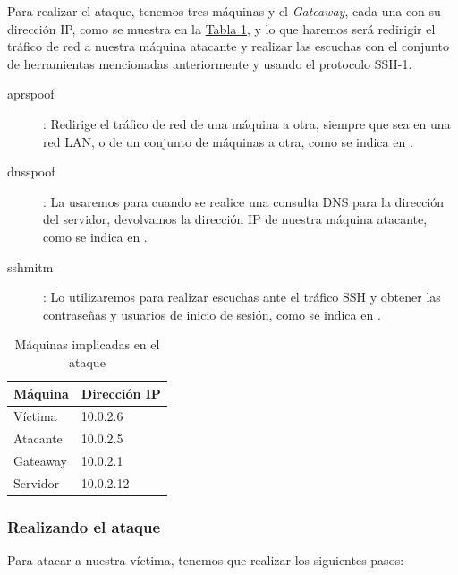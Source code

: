 \documentclass[10pt,a4paper,spanish]{article}
\begin{document}
Para realizar el ataque, tenemos tres máquinas y el \textit{Gateaway}, cada una con su dirección IP, como se muestra en la \hyperref[maquinas]{Tabla \ref*{maquinas}}, y lo que haremos será redirigir el tráfico de red a nuestra máquina atacante y realizar las escuchas con el conjunto de herramientas mencionadas anteriormente y usando el protocolo SSH-1.

\begin{description}
    \item [aprspoof]: Redirige el tráfico de red de una máquina a otra, siempre que sea en una red LAN, o de un conjunto de máquinas a otra, como se indica en \cite{arpspoof}.
    \item [dnsspoof]: La usaremos para cuando se realice una consulta DNS para la dirección del servidor, devolvamos la dirección IP de nuestra máquina atacante, como se indica en \cite{dnsspoof}.
    \item [sshmitm]: Lo utilizaremos para realizar escuchas ante el tráfico SSH y obtener las contraseñas y usuarios de inicio de sesión, como se indica en \cite{sshmitm}.
\end{description}

\begin{table}[H]
    \centering
    \begin{tabular}{|l|l|}
    \hline
    Máquina & Dirección IP \\
    \hline
    Víctima & 10.0.2.6 \\
    \hline
    Atacante & 10.0.2.5 \\
    \hline
    Gateaway & 10.0.2.1 \\
    \hline
    Servidor & 10.0.2.12 \\
    \hline
    \end{tabular}
    \caption{Máquinas implicadas en el ataque}
    \label{maquinas}
\end{table}

\subsubsection{Realizando el ataque}

Para atacar a nuestra víctima, tenemos que realizar los siguientes pasos:
\end{document}
